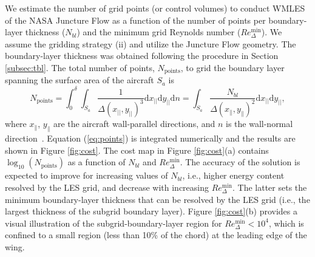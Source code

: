 \documentclass{ctr}
\begin{document}
We estimate the number of grid points (or control volumes) to conduct
WMLES of the NASA Juncture Flow as a function of the number of points
per boundary-layer thickness ($N_{bl}$) and the minimum grid Reynolds
number ($Re_{\Delta}^\mathrm{min}$). We assume the gridding strategy
(ii) and utilize the Juncture Flow geometry. The boundary-layer
thickness was obtained following the procedure in Section
\ref{subsec:tbl}. The total number of points, $N_\mathrm{points}$, to
grid the boundary layer spanning the surface area of the aircraft
$S_a$ is
%
\begin{equation}\label{eq:points}
  N_\mathrm{points} = \int_{0}^{\delta} \int_{S_a} \frac{1}{\Delta(x_{||},y_{||})^3} \mathrm{d}x_{||} \mathrm{d}y_{||} \mathrm{d}n
  = \int_{S_a} \frac{N_{bl}}{\Delta(x_{\parallel},y_{\parallel})^2} \mathrm{d}x_{||} \mathrm{d}y_{||}, 
\end{equation}
%
where $x_{\parallel}$, $y_{\parallel}$ are the aircraft wall-parallel
directions, and $n$ is the wall-normal direction~\citep[see
  also][]{Chapman1979, Spalart1997, Choi2012}. Equation
(\ref{eq:points}) is integrated numerically and the results are shown
in Figure \ref{fig:cost}.  The cost map in Figure \ref{fig:cost}(a)
contains $\log_{10}(N_\mathrm{points})$ as a function of $N_{bl}$ and
$Re_{\Delta}^\mathrm{min}$. The accuracy of the solution is expected
to improve for increasing values of $N_{bl}$, i.e., higher energy
content resolved by the LES grid, and decrease with increasing
$Re_{\Delta}^\mathrm{min}$. The latter sets the minimum boundary-layer
thickness that can be resolved by the LES grid (i.e., the largest
thickness of the subgrid boundary layer).  Figure \ref{fig:cost}(b)
provides a visual illustration of the subgrid-boundary-layer region
for $Re_\Delta^\mathrm{min} < 10^4$, which is confined to a small
region (less than 10\% of the chord) at the leading edge of the wing.
%
\end{document}
